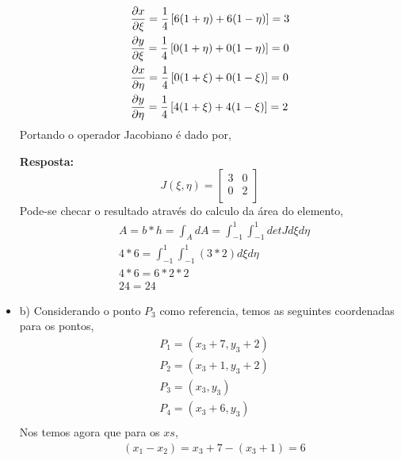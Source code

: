 \begin{itemize}
	\begin{equation}
		\begin{split}
			&	\frac{\partial x}{\partial \xi } = \frac{1}{4}\left[ 6(1 + \eta) + 6(1 - \eta) \right] = 3\\
			&   \frac{\partial y}{\partial \xi } = \frac{1}{4}\left[ 0(1 + \eta) + 0(1 - \eta) \right] = 0\\
			&   \frac{\partial x}{\partial \eta} = \frac{1}{4}\left[ 0(1 + \xi ) + 0(1 - \xi ) \right] = 0\\
			&   \frac{\partial y}{\partial \eta} = \frac{1}{4}\left[ 4(1 + \xi ) + 4(1 - \xi ) \right] = 2
		\end{split}
	\end{equation}
	Portando o operador Jacobiano é dado por,

	\color{blue}
	\textbf{Resposta:}
	\begin{equation}
	J(\xi, \eta) = 
	\begin{bmatrix}
		3 & 0\\
		0 & 2\\
	\end{bmatrix}
	\end{equation}	
	\color{black}
	Pode-se checar o resultado através do calculo da área do elemento,
	\begin{equation}
		\begin{split}
		& A = b * h = \int_A dA = \int_{-1}^1 \int_{-1}^1 det J d\xi d\eta\\
		& 4 * 6 = \int_{-1}^1 \int_{-1}^1 \left(3 * 2\right)  d\xi d\eta\\
		& 4 * 6 = 6 * 2 * 2 \\
		& 24 = 24		
		\end{split}
	\end{equation}
	\item b)
	Considerando o ponto $P_3$ como referencia, temos as seguintes coordenadas para os pontos,
	\begin{equation}
		\begin{split}
		&	P_1 = (x_3 + 7, y_3 + 2)\\
		&	P_2 = (x_3 + 1, y_3 + 2)\\
		&	P_3 = (x_3    , y_3    )\\
		&	P_4 = (x_3 + 6, y_3    )\\
		\end{split}
	\end{equation}
	Nos temos agora que para os $xs$,
	\begin{equation}
	\begin{split}
		&	(x_1 - x_2) = x_3 + 7 - (x_3 + 1) = 6 \\

\end{split}
\end{equation}
\end{itemize}
